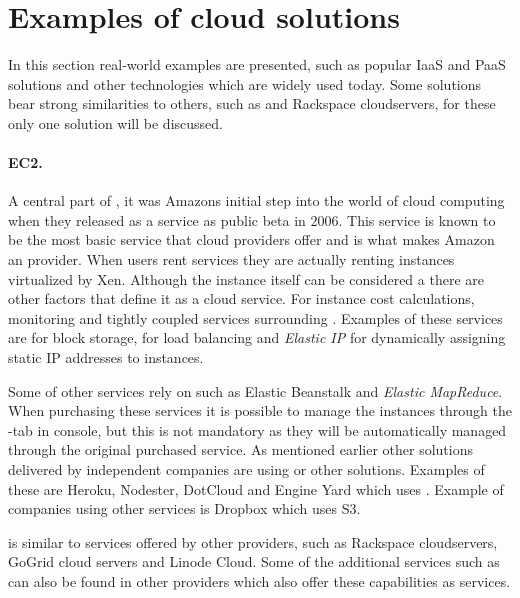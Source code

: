 \section{Examples of cloud solutions}

In this section real-world examples are presented, such as popular IaaS and PaaS solutions
and other technologies which are widely used today.
Some solutions bear strong similarities to others, such as  and Rackspace cloudservers,
for these only one solution will be discussed.

\paragraph{EC2.}

A central part of , it was Amazons initial step into the world of cloud computing when
they released  as a service as public beta in $2006$.
This service is known to be the most basic service that cloud providers offer and is 
what makes Amazon an  provider.
When users rent  services they are actually renting  
instances virtualized by Xen.
Although the instance itself can be considered a  there are other factors 
that define it as a cloud service.
For instance cost calculations, monitoring and tightly coupled services surrounding .
Examples of these services are  for block storage, 
 for load balancing and \emph{Elastic IP} 
for dynamically assigning static IP addresses to instances.

Some of  other services rely on  such as  Elastic Beanstalk 
and \emph{Elastic MapReduce}.
When purchasing these services it is possible to manage the  instances 
through the -tab in  console, but this is not mandatory
as they will be automatically managed through the original purchased service.
As mentioned earlier other  solutions delivered by independent companies
are using  or other  solutions.
Examples of these are Heroku, Nodester, DotCloud and Engine Yard which uses .
Example of companies using other  services is Dropbox which uses S3.

 is similar to services offered by other providers, 
such as Rackspace cloudservers, GoGrid cloud servers
and Linode Cloud.
Some of the additional services such as  can also be found in other providers
which also offer these capabilities as services.

